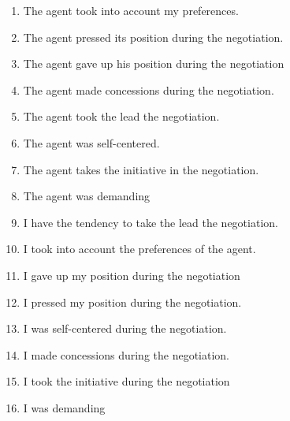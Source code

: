 \documentclass [french]{paper}
\begin{document}
\begin{enumerate}
				
				\item The agent took into account my preferences.
				\item The agent pressed its position during the negotiation.
				\item The agent gave up his position during the negotiation
				\item The agent made concessions during the negotiation.
				\item The agent took the lead the negotiation.
				\item The agent was self-centered.
				\item The agent takes the initiative in the negotiation.
				\item The agent was demanding
				
				\item I have the tendency to take the lead the negotiation.
				\item I took into account the preferences of the agent.
				\item I gave up my position during the negotiation
				\item I pressed my position during the negotiation.
				\item I was self-centered during the negotiation.
				\item I made concessions during the negotiation.
				\item I took the initiative during the negotiation
				\item I was demanding

				
			\end{enumerate}
		
\end{document}

